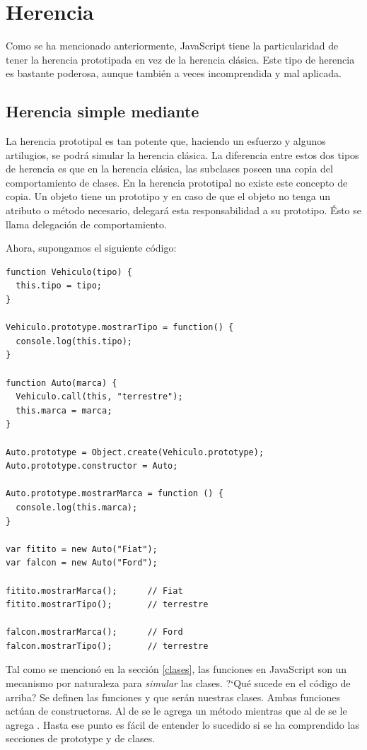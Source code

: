 \section{Herencia}
\label{herencia}

Como se ha mencionado anteriormente, JavaScript tiene la particularidad de tener la herencia prototipada en vez de la herencia clásica. Este tipo de herencia es bastante poderosa, aunque también a veces incomprendida y mal aplicada.

\subsection{Herencia simple mediante }

La herencia prototipal es tan potente que, haciendo un esfuerzo y algunos artilugios, se podrá simular la herencia clásica. La diferencia entre estos dos tipos de herencia es que en la herencia clásica, las subclases poseen una copia del comportamiento de clases. En la herencia prototipal no existe este concepto de copia. Un objeto tiene un prototipo y en caso de que el objeto no tenga un atributo o método necesario, delegará esta responsabilidad a su prototipo. Ésto se llama delegación de comportamiento.

Ahora, supongamos el siguiente código:

\begin{lstlisting}[title={Analizando herencia prototipal en JS}]
function Vehiculo(tipo) {
  this.tipo = tipo;
}

Vehiculo.prototype.mostrarTipo = function() {
  console.log(this.tipo);
}

function Auto(marca) {
  Vehiculo.call(this, "terrestre");
  this.marca = marca;
}

Auto.prototype = Object.create(Vehiculo.prototype);
Auto.prototype.constructor = Auto;

Auto.prototype.mostrarMarca = function () {
  console.log(this.marca);
}

var fitito = new Auto("Fiat");
var falcon = new Auto("Ford");
 
fitito.mostrarMarca();      // Fiat
fitito.mostrarTipo();       // terrestre

falcon.mostrarMarca();      // Ford
falcon.mostrarTipo();       // terrestre
\end{lstlisting}

Tal como se mencionó en la sección \ref{clases}, las funciones en JavaScript son un mecanismo por naturaleza para \textit{simular} las clases. ?`Qué sucede en el código de arriba? Se definen las funciones  y  que serán nuestras clases. Ambas funciones actúan de constructoras. Al \code{[[Prototype]]} de  se le agrega un método  mientras que al \code{[[Prototype]]} de  se le agrega . Hasta ese punto es fácil de entender lo sucedido si se ha comprendido las secciones de prototype y de clases. 

